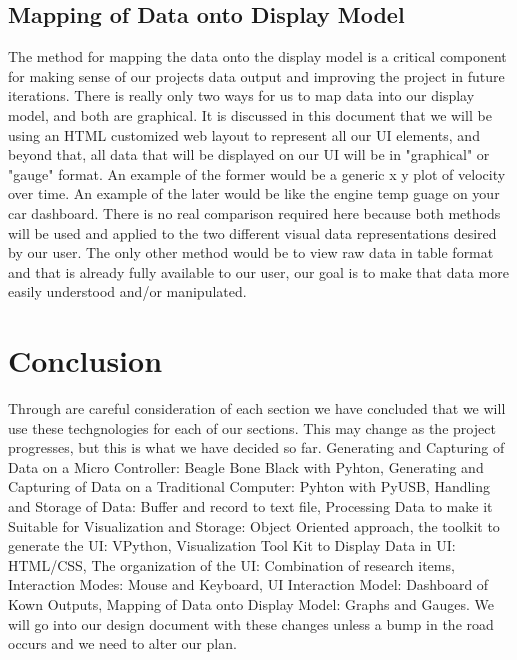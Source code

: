 \documentclass[10pt,draftclsnofoot,onecolumn]{IEEEtran}
\begin{document}
\subsection{Mapping of Data onto Display Model}
The method for mapping the data onto the display model is a critical component for making sense of our projects data output and improving the project in future iterations. There is really only two ways for us to map data into our display model, and both are graphical. It is discussed in this document that we will be using an HTML customized web layout to represent all our UI elements, and beyond that, all data that will be displayed on our UI will be in "graphical" or "gauge" format. An example of the former would be a generic x y plot of velocity over time. An example of the later would be like the engine temp guage on your car dashboard. There is no real comparison required here because both methods will be used and applied to the two different visual data representations desired by our user. The only other method would be to view raw data in table format and that is already fully available to our user, our goal is to make that data more easily understood and/or manipulated.\par

\section{Conclusion}
Through are careful consideration of each section we have concluded that we will use these techgnologies for each of our sections. This may change as the project progresses, but this is what we have decided so far. Generating and Capturing of Data on a Micro Controller: Beagle Bone Black with Pyhton, Generating and Capturing of Data on a Traditional Computer: Pyhton with PyUSB, Handling and Storage of Data: Buffer and record to text file, Processing Data to make it Suitable for Visualization and Storage: Object Oriented approach, the toolkit to generate the UI: VPython, Visualization Tool Kit to Display Data in UI: HTML/CSS, The organization of the UI: Combination of research items, Interaction Modes: Mouse and Keyboard, UI Interaction Model: Dashboard of Kown Outputs, Mapping of Data onto Display Model: Graphs and Gauges. We will go into our design document with these changes unless a bump in the road occurs and we need to alter our plan.
\end{document}
